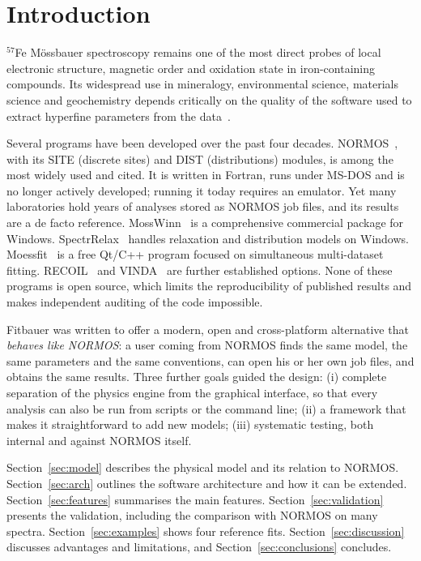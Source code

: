 \documentclass[smallcondensed]{svjour3}
\begin{document}
\section{Introduction}
\label{sec:intro}

$^{57}$Fe M\"{o}ssbauer spectroscopy remains one of the most direct
probes of local electronic structure, magnetic order and oxidation
state in iron-containing compounds. Its widespread use in mineralogy,
environmental science, materials science and geochemistry depends
critically on the quality of the software used to extract hyperfine
parameters from the data~\cite{Greenwood1971,Gütlich2011}.

Several programs have been developed over the past four decades.
NORMOS~\cite{Brand1987,Brand1990}, with its SITE (discrete sites) and DIST
(distributions) modules, is among the most widely used and cited. It is
written in Fortran, runs under MS-DOS and is no longer actively developed;
running it today requires an emulator. Yet many laboratories hold years of
analyses stored as NORMOS job files, and its results are a de facto
reference.
MossWinn~\cite{Klencsar2013} is a comprehensive commercial package for
Windows. SpectrRelax~\cite{Matsnev2012} handles relaxation and distribution
models on Windows. Moessfit~\cite{Kamusella2016} is a free Qt/C++ program
focused on simultaneous multi-dataset fitting. RECOIL~\cite{Lagarec1998}
and VINDA~\cite{vinda} are further established options.
None of these programs is open source, which limits the reproducibility of
published results and makes independent auditing of the code impossible.

Fitbauer was written to offer a modern, open and cross-platform
alternative that \emph{behaves like NORMOS}: a user coming from NORMOS
finds the same model, the same parameters and the same conventions, can
open his or her own job files, and obtains the same results. Three further
goals guided the design:
(i) complete separation of the physics engine from the graphical
interface, so that every analysis can also be run from scripts or the
command line;
(ii) a framework that makes it straightforward to add new models;
(iii) systematic testing, both internal and against NORMOS itself.

Section~\ref{sec:model} describes the physical model and its relation to
NORMOS. Section~\ref{sec:arch} outlines the software architecture and how
it can be extended. Section~\ref{sec:features} summarises the main
features. Section~\ref{sec:validation} presents the validation, including
the comparison with NORMOS on many spectra. Section~\ref{sec:examples}
shows four reference fits. Section~\ref{sec:discussion} discusses
advantages and limitations, and Section~\ref{sec:conclusions} concludes.
\end{document}
